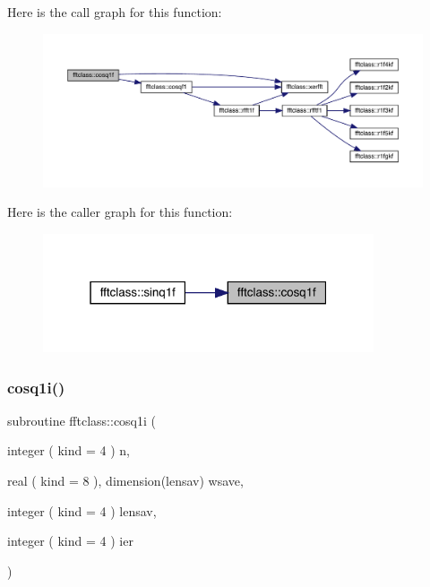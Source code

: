 Here is the call graph for this function\+:\nopagebreak
\begin{figure}[H]
\begin{center}
\leavevmode
\includegraphics[width=350pt]{namespacefftclass_a546e80f6eb00444bf4508ae26186e0d2_cgraph}
\end{center}
\end{figure}
Here is the caller graph for this function\+:\nopagebreak
\begin{figure}[H]
\begin{center}
\leavevmode
\includegraphics[width=277pt]{namespacefftclass_a546e80f6eb00444bf4508ae26186e0d2_icgraph}
\end{center}
\end{figure}
\mbox{\label{namespacefftclass_ab281b0d26ef5d825f00696ab35e18e65}} 
\subsubsection{\texorpdfstring{cosq1i()}{cosq1i()}}
{\footnotesize\ttfamily subroutine fftclass\+::cosq1i (\begin{DoxyParamCaption}\item[{integer ( kind = 4 )}]{n,  }\item[{real ( kind = 8 ), dimension(lensav)}]{wsave,  }\item[{integer ( kind = 4 )}]{lensav,  }\item[{integer ( kind = 4 )}]{ier }\end{DoxyParamCaption})}

